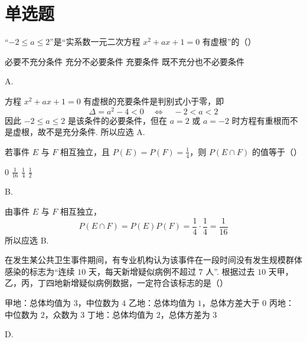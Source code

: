 \section{单选题}

\begin{problem}
“\(-2 \leqslant a \leqslant 2\)”是“实系数一元二次方程 \(x^2 + ax + 1 = 0\) 有虚根”的（\quad）

\choices
    {必要不充分条件}
    {充分不必要条件}
    {充要条件}
    {既不充分也不必要条件}
\end{problem}

\begin{answer}
A.
\end{answer}

\begin{solution}
方程 \(x^2+ax+1=0\) 有虚根的充要条件是判别式小于零，即
\[
\Delta=a^2-4<0\quad\Longleftrightarrow\quad -2<a<2
\]
因此 \(-2\leqslant a\leqslant2\) 是该条件的必要条件，但在 \(a=2\) 或 \(a=-2\) 时方程有重根而不是虚根，故不是充分条件. 所以应选 A.
\end{solution}

\begin{problem}
若事件 \(E\) 与 \(F\) 相互独立，且 \(P(E) = P(F) = \frac{1}{4}\)，则 \(P(E \cap F)\) 的值等于（\quad）

\choices
    {\(0\)}
    {\(\frac{1}{16}\)}
    {\(\frac{1}{4}\)}
    {\(\frac{1}{2}\)}
\end{problem}

\begin{answer}
B.
\end{answer}

\begin{solution}
由事件 \(E\) 与 \(F\) 相互独立，
\[
P(E\cap F)=P(E)P(F)=\frac14\cdot\frac14=\frac1{16}
\]
所以应选 B.
\end{solution}

\begin{problem}
在发生某公共卫生事件期间，有专业机构认为该事件在一段时间没有发生规模群体感染的标志为“连续 \(10\) 天，每天新增疑似病例不超过 \(7\) 人”. 根据过去 \(10\) 天甲，乙，丙，丁四地新增疑似病例数据，一定符合该标志的是（\quad）

\choices
    {甲地：总体均值为 \(3\)，中位数为 \(4\)}
    {乙地：总体均值为 \(1\)，总体方差大于 \(0\)}
    {丙地：中位数为 \(2\)，众数为 \(3\)}
    {丁地：总体均值为 \(2\)，总体方差为 \(3\)}
\end{problem}

\begin{answer}
D.
\end{answer}

